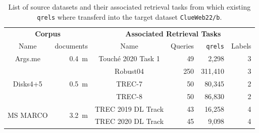 \begin{table}[h!]
    \centering
    \footnotesize
    \caption{List of source datasets and their associated retrieval tasks from which existing \texttt{qrels} where transferd into the target dataset \texttt{ClueWeb22/b}.}
    \label{tab:datasets}
    \begin{tabular}{crcrrr}
        \toprule
        \multicolumn{2}{c}{\textbf{Corpus}} & \multicolumn{4}{c}{\textbf{ Associated Retrieval Tasks}} \\
        \cmidrule(lr){1-2} \cmidrule(lr){3-6}
        Name & documents  & Name & Queries &\texttt{qrels} & Labels \\
        \toprule
        
        Args.me & 0.4~m & Touché 2020 Task 1 & 49 & 2,298 & 3 \\
        \midrule



        \multirow{3}{*}{Disks4+5} & \multirow{3}{*}{0.5~m} & Robust04 & 250 & 311,410 & 3 \\
        & & TREC-7 & 50 & 80,345 & 2 \\
        & & TREC-8 & 50 & 86,830 & 2 \\
        \midrule

        \multirow{2}{*}{MS MARCO} & \multirow{2}{*}{3.2~m} & TREC 2019 DL Track & 43 & 16,258 & 4 \\
        & & TREC 2020 DL Track & 45 & 9,098 & 4 \\
        
        \bottomrule
    \end{tabular}
\end{table}

